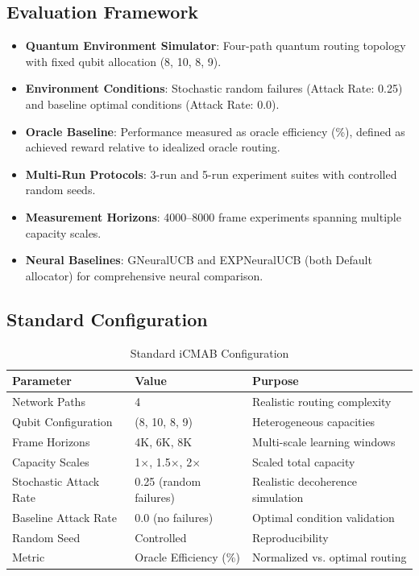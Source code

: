 \documentclass[12pt,a4paper]{article}
\begin{document}
\subsection{Evaluation Framework}
\begin{itemize}
\item \textbf{Quantum Environment Simulator}: Four-path quantum routing topology with fixed qubit allocation (8, 10, 8, 9).
\item \textbf{Environment Conditions}: Stochastic random failures (Attack Rate: 0.25) and baseline optimal conditions (Attack Rate: 0.0).
\item \textbf{Oracle Baseline}: Performance measured as oracle efficiency (\%), defined as achieved reward relative to idealized oracle routing.
\item \textbf{Multi-Run Protocols}: 3-run and 5-run experiment suites with controlled random seeds.
\item \textbf{Measurement Horizons}: 4000--8000 frame experiments spanning multiple capacity scales.
\item \textbf{Neural Baselines}: GNeuralUCB and EXPNeuralUCB (both Default allocator) for comprehensive neural comparison.
\end{itemize}

\subsection{Standard Configuration}
\begin{table}[H]
\centering
\caption{Standard iCMAB Configuration}
\begin{tabular}{@{}lll@{}}
\toprule
\textbf{Parameter} & \textbf{Value} & \textbf{Purpose} \\
\midrule
Network Paths & 4 & Realistic routing complexity \\
Qubit Configuration & (8, 10, 8, 9) & Heterogeneous capacities \\
Frame Horizons & 4K, 6K, 8K & Multi-scale learning windows \\
Capacity Scales & 1$\times$, 1.5$\times$, 2$\times$ & Scaled total capacity \\
Stochastic Attack Rate & 0.25 (random failures) & Realistic decoherence simulation \\
Baseline Attack Rate & 0.0 (no failures) & Optimal condition validation \\
Random Seed & Controlled & Reproducibility \\
Metric & Oracle Efficiency (\%) & Normalized vs. optimal routing \\
\bottomrule
\end{tabular}
\end{table}
\end{document}
